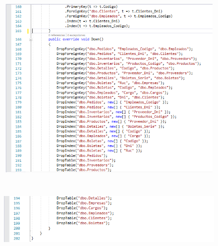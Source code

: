 \documentclass[12pt,a4paper,oneside]{book}
\begin{document}
\begin{enumerate}
\begin{enumerate}
\begin{enumerate}
								\begin{figure}[htb]
									\centering \includegraphics[width=12cm, height=9cm]{img/Migraciones/9clasemigra.png}
								\end{figure}
					\newpage	
								\begin{figure}[htb]
									\centering \includegraphics[width=12cm, height=4cm]{img/Migraciones/10clasemigra.png}
								\end{figure}
							

\end{enumerate}
\end{enumerate}
\end{enumerate}
\end{document}
